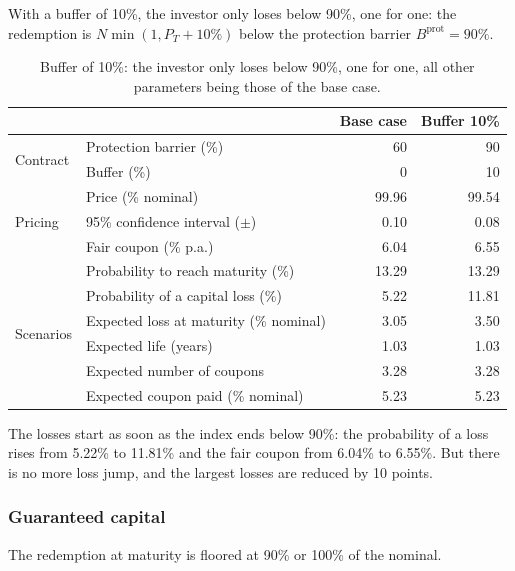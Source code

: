 \documentclass[11pt,a4paper]{article}
\begin{document}
With a buffer of 10\%, the investor only loses below 90\%, one for one: the redemption is $N \min(1, P_T + 10\%)$
below the protection barrier $B^{\mathrm{prot}} = 90\%$.

\begin{table}[htbp]
  \centering
  \small
  \begin{tabular}{llrr}
    \toprule
     & & \textbf{Base case} & \textbf{Buffer 10\%} \\
    \midrule
    \multirow{2}{*}{Contract}
      & Protection barrier (\%) & 60 & 90 \\
      & Buffer (\%) & 0 & 10 \\
    \midrule
    \multirow{3}{*}{Pricing}
      & Price (\% nominal) & 99.96 & 99.54 \\
      & 95\% confidence interval ($\pm$) & 0.10 & 0.08 \\
      & Fair coupon (\% p.a.) & 6.04 & 6.55 \\
    \midrule
    \multirow{6}{*}{Scenarios}
      & Probability to reach maturity (\%) & 13.29 & 13.29 \\
      & Probability of a capital loss (\%) & 5.22 & 11.81 \\
      & Expected loss at maturity (\% nominal) & 3.05 & 3.50 \\
      & Expected life (years) & 1.03 & 1.03 \\
      & Expected number of coupons & 3.28 & 3.28 \\
      & Expected coupon paid (\% nominal) & 5.23 & 5.23 \\
    \bottomrule
  \end{tabular}
  \caption{Buffer of 10\%: the investor only loses below 90\%, one for one, all other parameters being those of the base case.}
  \label{tab:phoenix-buffer}
\end{table}

The losses start as soon as the index ends below 90\%: the probability of a loss rises from 5.22\% to 11.81\% and the
fair coupon from 6.04\% to 6.55\%. But there is no more loss jump, and the largest losses are reduced by 10 points.

\clearpage
\subsubsection{Guaranteed capital}

The redemption at maturity is floored at 90\% or 100\% of the nominal.
\end{document}
